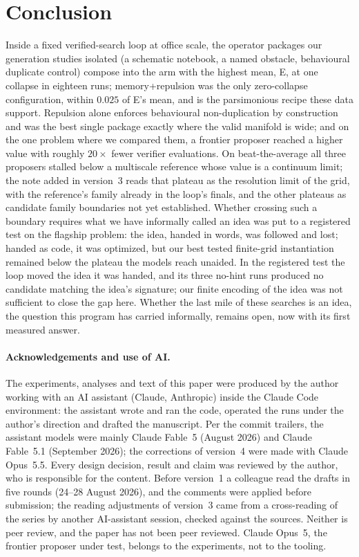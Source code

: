 \documentclass[11pt]{article}
\begin{document}
\section{Conclusion}
\label{sec:conclusion}

Inside a fixed verified-search loop at office scale, the operator
packages our generation studies isolated (a schematic notebook, a named
obstacle, behavioural duplicate control) compose into the arm with the
highest mean, E, at one collapse in eighteen runs; memory+repulsion was
the only zero-collapse configuration, within $0.025$ of E's mean, and is
the parsimonious recipe these data support. Repulsion alone enforces
behavioural non-duplication by construction and was the best single
package exactly where the valid manifold is wide; and on the one problem
where we compared them, a frontier proposer reached a higher value with
roughly $20\times$ fewer verifier evaluations. On beat-the-average all
three proposers stalled below a multiscale reference whose value is a continuum
limit; the note added in version~3 reads that plateau as the resolution limit of
the grid, with the reference's family already in the loop's finals, and
the other plateaus as candidate family boundaries not yet established.
Whether crossing such a boundary requires what we have informally called an idea
was put to a registered test on the flagship problem: the idea, handed
in words, was followed and lost; handed as code, it was optimized, but
our best tested finite-grid instantiation remained below the plateau the
models reach unaided. In the registered test the loop moved the idea it
was handed, and its three no-hint runs produced no candidate matching
the idea's signature; our finite encoding of the idea was not sufficient
to close the gap here. Whether the last mile of these searches is an idea, the
question this program has carried informally, remains open, now with its
first measured answer.

\paragraph{Acknowledgements and use of AI.} The experiments, analyses
and text of this paper were produced by the author working with an AI
assistant (Claude, Anthropic) inside the Claude Code environment: the
assistant wrote and ran the code, operated the runs under the author's
direction and drafted the manuscript. Per the commit trailers, the
assistant models were mainly Claude Fable~5 (August 2026) and Claude
Fable~5.1 (September 2026); the corrections of version~4 were made with
Claude Opus~5.5. Every design decision, result and claim was reviewed
by the author, who is responsible for the content. Before version~1 a
colleague read the drafts in five rounds (24--28 August 2026), and the
comments were applied before submission; the reading adjustments of
version~3 came from a cross-reading of the series by another AI-assistant
session, checked against the sources. Neither is peer review,
and the paper has not been peer reviewed. Claude Opus~5, the frontier
proposer under test, belongs to the experiments, not to the tooling.
\end{document}
